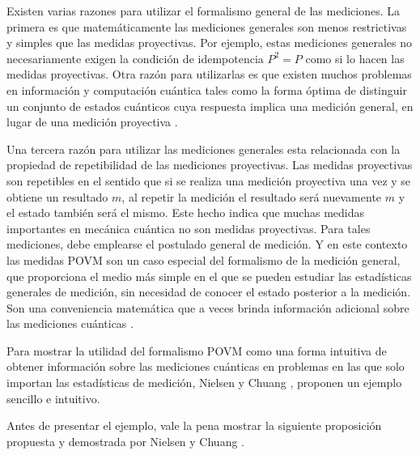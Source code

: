 Existen varias razones para utilizar el formalismo general de las mediciones. La primera es que matemáticamente las mediciones generales son menos restrictivas y simples que las medidas proyectivas. Por ejemplo, estas mediciones generales no necesariamente exigen la condición de idempotencia $P^2=P$ como si lo hacen las medidas proyectivas. Otra razón para utilizarlas es que existen muchos problemas en información y computación cuántica tales como la forma óptima de distinguir un conjunto de estados cuánticos cuya respuesta implica una medición general, en lugar de una medición proyectiva {\cite{nielsen_chuang_2010}}.


Una tercera razón para utilizar las mediciones generales esta relacionada con la propiedad de repetibilidad de las mediciones proyectivas. Las medidas proyectivas son repetibles en el sentido que si se realiza una medición proyectiva una vez y se obtiene un resultado $m$, al repetir la medición el resultado será nuevamente $m$ y el estado también será el mismo. Este hecho indica que muchas medidas importantes en mecánica cuántica no son medidas proyectivas.  Para tales mediciones, debe emplearse el postulado general de medición. Y en este contexto las medidas POVM son un caso especial del formalismo de la medición general, que proporciona el medio más simple en el que se pueden estudiar las estadísticas generales de medición, sin necesidad de conocer el estado posterior a la medición. Son una conveniencia matemática que a veces brinda información adicional sobre las mediciones cuánticas {\cite{nielsen_chuang_2010}}.


Para mostrar la utilidad del formalismo POVM como una forma intuitiva de
obtener información sobre las mediciones cuánticas en problemas en las que solo
importan las estadísticas de medición, Nielsen y Chuang
{\cite{nielsen_chuang_2010}}, proponen un ejemplo sencillo e intuitivo.

Antes de presentar el ejemplo, vale la pena mostrar la siguiente proposición
propuesta y demostrada por Nielsen y Chuang {\cite{nielsen_chuang_2010}}.

